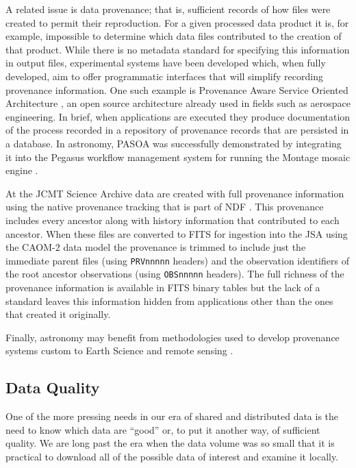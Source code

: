 \documentclass[final,authoryear,5p,times,twocolumn]{elsarticle}
\begin{document}
{{A related issue is data provenance; that is, sufficient records of how files
were created to permit their reproduction. For a given processed data product
it is, for example, impossible to determine which data files
contributed to the creation of that product. While there is no metadata standard
for specifying this
information in output files, experimental systems have been developed which, when fully developed,
aim to offer programmatic interfaces that will
simplify recording provenance information. One such example is
Provenance Aware Service Oriented Architecture
\citep[PASOA;][]{2008IPAWMoreau,2011743Moreau}, an open source architecture
already used in fields such as aerospace engineering. In brief, when
applications are executed they produce documentation of the process recorded
in a repository of provenance records that are persisted in a database. In
astronomy, PASOA was successfully demonstrated by integrating it into the
Pegasus workflow management system for running the Montage mosaic engine
\citep{2009SCGroth}.


At the JCMT Science Archive \citep[JSA;][]{2008ASPC..394..135G,2015Economou} data are
created with full provenance information using the native provenance
tracking that is part of NDF \citep{2009ASPC..411..418J}. This
provenance includes every ancestor along with history information that
contributed to each ancestor. When these files are converted to FITS
for ingestion into the JSA using the CAOM-2 data model
\citep{2013ASPC..475..159R} the provenance is trimmed to include
just the immediate parent files (using \texttt{PRVnnnnn} headers)
and the observation identifiers of the root ancestor observations
(using \texttt{OBSnnnnn} headers). The full richness of the provenance
information is available in FITS binary tables but the lack of a standard
leaves this information hidden from applications other than the ones
that created it originally.

Finally, astronomy may benefit from methodologies used to develop provenance
systems custom to Earth Science and remote sensing
\citep{2008IPAWTilmes,2008IPAWMcCann}.


\subsection{Data Quality}


One of the more pressing needs in our era of shared and distributed
data is the need to know which data are ``good'' or, to put it another
way, of sufficient quality. We are long past the era when the data
volume was so small that it is practical to download all of the possible
data of interest and examine it locally.


}}
\end{document}
